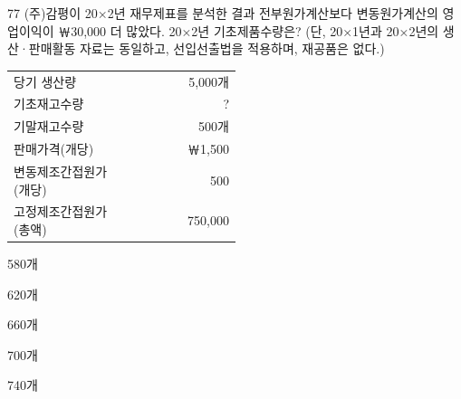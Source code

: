\begin{question}{77}
(주)감평이 20×2년 재무제표를 분석한 결과 전부원가계산보다 변동원가계산의 영업이익이 ￦30,000 더 많았다. 20×2년 기초제품수량은? (단, 20×1년과 20×2년의 생산·판매활동 자료는 동일하고, 선입선출법을 적용하며, 재공품은 없다.)

{\small\centering\begin{tabular}{|p{0.5\linewidth}|r|}\hline
당기 생산량 & 5,000개 \\
기초재고수량 & ? \\
기말재고수량 & 500개 \\ \hline
판매가격(개당) & ￦1,500 \\
변동제조간접원가(개당) & 500 \\
고정제조간접원가(총액) & 750,000 \\ \hline
\end{tabular}\par}
\vspace{4pt}
\begin{choices}
  \item 580개
  \item 620개
  \item 660개
  \item 700개
  \item 740개
\end{choices}
\end{question}
